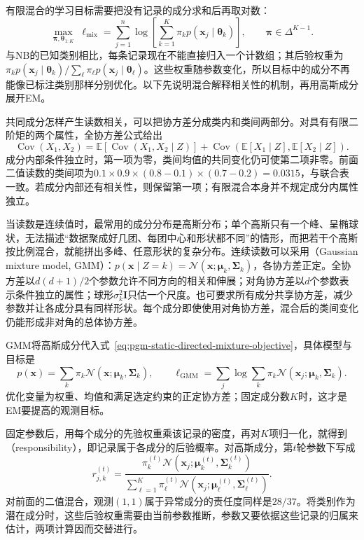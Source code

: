 有限混合的学习目标需要把没有记录的成分求和后再取对数：
\begin{equation}
 \max_{\bm\pi,\bm\theta_{1:K}}\;
 \ell_{\mathrm{mix}}=\sum_{j=1}^n\log\left[
    \sum_{k=1}^K\pi_kp(\bm x_j\mid\bm\theta_k)\right],
 \qquad \bm\pi\in\Delta^{K-1}.
 \label{eq:pgm-static-directed-mixture-objective}
\end{equation}
与NB的已知类别相比，每条记录现在不能直接归入一个计数组；其后验权重为$\pi_kp(\bm x_j\mid\bm\theta_k)/\sum_\ell\pi_\ell p(\bm x_j\mid\bm\theta_\ell)$。这些权重随参数变化，所以目标中的成分不再能像已标注类别那样分别优化。以下先说明混合解释相关性的机制，再用高斯成分展开EM。

共同成分怎样产生读数相关，可以把协方差分成类内和类间两部分。对具有有限二阶矩的两个属性，全协方差公式给出
\[
  \operatorname{Cov}(X_1,X_2)=
  \mathbb{E}\!\left[\operatorname{Cov}(X_1,X_2\mid Z)\right]
  +\operatorname{Cov}\!\left(
       \mathbb{E}[X_1\mid Z],\mathbb{E}[X_2\mid Z]\right).
\]
成分内部条件独立时，第一项为零，类间均值的共同变化仍可使第二项非零。前面二值读数的类间项为$0.1\times0.9\times(0.8-0.1)\times(0.7-0.2)=0.0315$，与联合表一致。若成分内部还有相关性，则保留第一项；有限混合本身并不规定成分内属性独立。

当读数是连续值时，最常用的成分分布是高斯分布；单个高斯只有一个峰、呈椭球状，无法描述“数据聚成好几团、每团中心和形状都不同”的情形，而把若干个高斯按比例混合，就能拼出多峰、任意形状的复杂分布。连续读数可以采用（Gaussian mixture model, GMM）：$p(\bm x\mid Z=k)=\mathcal N(\bm x;\bm\mu_k,\bm\Sigma_k)$，各协方差正定。全协方差以$d(d+1)/2$个参数允许不同方向的相关和伸展；对角协方差以$d$个参数表示条件独立的属性；球形$\sigma_k^2\bm I$只估一个尺度。也可要求所有成分共享协方差，减少参数并让各成分具有同样形状。每个成分即使使用对角协方差，混合后的类间变化仍能形成非对角的总体协方差。

GMM将高斯成分代入式~\eqref{eq:pgm-static-directed-mixture-objective}，具体模型与目标是
\begin{equation}
 p(\bm x)=\sum_k\pi_k\mathcal N(\bm x;\bm\mu_k,\bm\Sigma_k),
 \qquad
 \ell_{\mathrm{GMM}}=\sum_j\log\sum_k\pi_k
          \mathcal N(\bm x_j;\bm\mu_k,\bm\Sigma_k).
 \label{eq:pgm-static-directed-gmm-objective}
\end{equation}
优化变量为权重、均值和满足选定约束的正定协方差；固定成分数$K$时，这才是EM要提高的观测目标。

固定参数后，用每个成分的先验权重乘该记录的密度，再对$K$项归一化，就得到（responsibility），即记录属于各成分的后验概率。对高斯成分，第$t$轮参数下写成
\begin{equation}
  \label{eq:pgm-static-directed-responsibility}
  r_{j,k}^{(t)}=
  \frac{\pi_k^{(t)}
      \mathcal{N}(\bm{x}_j;\bm{\mu}_k^{(t)},\bm{\Sigma}_k^{(t)})}
       {\sum_{\ell=1}^{K}\pi_\ell^{(t)}
      \mathcal{N}(\bm{x}_j;\bm{\mu}_\ell^{(t)},\bm{\Sigma}_\ell^{(t)})}.
\end{equation}
对前面的二值混合，观测$(1,1)$属于异常成分的责任度同样是$28/37$。将类别作为潜在成分时，这些后验权重需要由当前参数推断，参数又要依据这些记录的归属来估计，两项计算因而交替进行。


